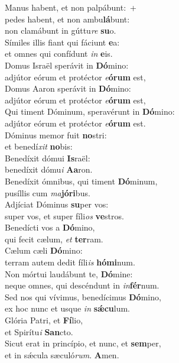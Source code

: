 \oddverse Manus habent, et non palpábunt:~+\\
\oddverse  pedes habent, et non ambu\textbf{lá}bunt:~\*\\
\oddverse non clamábunt in gúttu\textit{re} \textbf{su}o.\\
\evenverse Símiles illis fiant qui fáciunt \textbf{e}a:~\*\\
\evenverse et omnes qui confídunt \textit{in} \textbf{e}is.\\
\oddverse Domus Israël sperávit in \textbf{Dó}mino:~\*\\
\oddverse adjútor eórum et protéctor \textit{e}\textbf{ó}\textbf{rum} est,\\
\evenverse Domus Aaron sperávit in \textbf{Dó}mino:~\*\\
\evenverse adjútor eórum et protéctor \textit{e}\textbf{ó}\textbf{rum} est,\\
\oddverse Qui timent Dóminum, speravérunt in \textbf{Dó}mino:~\*\\
\oddverse adjútor eórum et protéctor \textit{e}\textbf{ó}\textbf{rum} est.\\
\evenverse Dóminus memor fuit \textbf{no}stri:~\*\\
\evenverse et benedí\textit{xit} \textbf{no}bis:\\
\oddverse Benedíxit dómui \textbf{Is}raël:~\*\\
\oddverse benedíxit dómu\textit{i} \textbf{A}\textbf{a}ron.\\
\evenverse Benedíxit ómnibus, qui timent \textbf{Dó}minum,~\*\\
\evenverse pusíllis cum \textit{ma}\textbf{jó}\textbf{ri}bus.\\
\oddverse Adjíciat Dóminus \textbf{su}per vos:~\*\\
\oddverse super vos, et super fíli\textit{os} \textbf{ve}stros.\\
\evenverse Benedícti vos a \textbf{Dó}mino,~\*\\
\evenverse qui fecit cælum, \textit{et} \textbf{ter}ram.\\
\oddverse Cælum cæli \textbf{Dó}mino:~\*\\
\oddverse terram autem dedit fíli\textit{is} \textbf{hó}\textbf{mi}num.\\
\evenverse Non mórtui laudábunt te, \textbf{Dó}mine:~\*\\
\evenverse neque omnes, qui descéndunt in \textit{in}\textbf{fér}num.\\
\oddverse Sed nos qui vívimus, benedícimus \textbf{Dó}mino,~\*\\
\oddverse ex hoc nunc et usque \textit{in} \textbf{sǽ}\textbf{cu}lum.\\
\evenverse Glória Patri, et \textbf{Fí}lio,~\*\\
\evenverse et Spirítu\textit{i} \textbf{San}cto.\\
\oddverse Sicut erat in princípio, et nunc, et \textbf{sem}per,~\*\\
\oddverse et in sǽcula sæculó\textit{rum}. \textbf{A}men.\\
